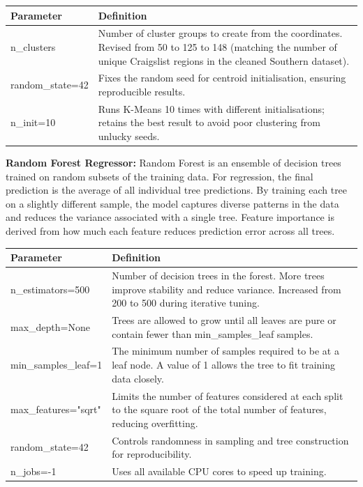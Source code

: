 \begin{table}[H]
    \centering
    \begin{tabular}{||l|p{12cm}||}
    \hline
    \hline
        Parameter & Definition \\
        \hline
        \hline
        n\_clusters & Number of cluster groups to create from the coordinates. Revised from 50 to 125 to 148 (matching the number of unique Craigslist regions in the cleaned Southern dataset). \\
        \hline
        random\_state=42 & Fixes the random seed for centroid initialisation, ensuring reproducible results. \\
        \hline
        n\_init=10 & Runs K-Means 10 times with different initialisations; retains the best result to avoid poor clustering from unlucky seeds. \\
        \hline
        \hline
    \end{tabular}
\end{table}

\vspace{-12pt}
\noindent
\textbf{Random Forest Regressor:}
Random Forest is an ensemble of decision trees trained on random subsets of the training data. For regression, the final prediction is the average of all individual tree predictions. By training each tree on a slightly different sample, the model captures diverse patterns in the data and reduces the variance associated with a single tree. Feature importance is derived from how much each feature reduces prediction error across all trees.

\begin{table}[H]
    \centering
    \begin{tabular}{||l|p{12cm}||}
    \hline
    \hline
        Parameter & Definition \\
        \hline
        \hline
        n\_estimators=500 & Number of decision trees in the forest. More trees improve stability and reduce variance. Increased from 200 to 500 during iterative tuning. \\
        \hline
        max\_depth=None & Trees are allowed to grow until all leaves are pure or contain fewer than min\_samples\_leaf samples. \\
        \hline
        min\_samples\_leaf=1 & The minimum number of samples required to be at a leaf node. A value of 1 allows the tree to fit training data closely. \\
        \hline
        max\_features="sqrt" & Limits the number of features considered at each split to the square root of the total number of features, reducing overfitting. \\
        \hline
        random\_state=42 & Controls randomness in sampling and tree construction for reproducibility. \\
        \hline
        n\_jobs=-1 & Uses all available CPU cores to speed up training. \\
        \hline
        \hline
    \end{tabular}
\end{table}


